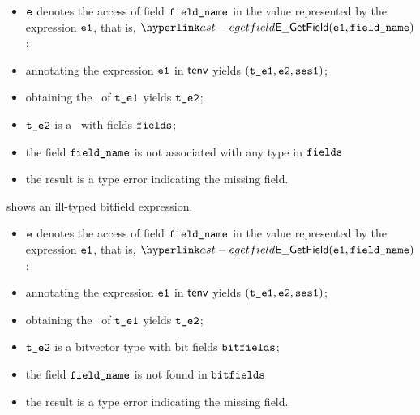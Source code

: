 \ProseParagraph
\AllApply
\begin{itemize}
  \item $\ve$ denotes the access of field $\fieldname$ in the value represented by the expression $\veone$, that is, $\EGetField(\veone, \fieldname)$;
  \item annotating the expression $\veone$ in $\tenv$ yields $(\vteone, \vetwo, \vsesone)$\ProseOrTypeError;
  \item obtaining the \underlyingtype\ of $\vteone$ yields $\vtetwo$\ProseOrTypeError;
  \item $\vtetwo$ is a \structuredtype\ with fields $\fields$;
  \item the field $\fieldname$ is not associated with any type in $\fields$
  \item the result is a type error indicating the missing field.
\end{itemize}
\FormallyParagraph
\begin{mathpar}
\end{mathpar}

 shows an ill-typed bitfield expression.

\ProseParagraph
\AllApply
\begin{itemize}
  \item $\ve$ denotes the access of field $\fieldname$ in the value represented by the expression $\veone$, that is, $\EGetField(\veone, \fieldname)$;
  \item annotating the expression $\veone$ in $\tenv$ yields $(\vteone, \vetwo, \vsesone)$\ProseOrTypeError;
  \item obtaining the \underlyingtype\ of $\vteone$ yields $\vtetwo$\ProseOrTypeError;
  \item $\vtetwo$ is a bitvector type with bit fields $\bitfields$;
  \item the field $\fieldname$ is not found in $\bitfields$
  \item the result is a type error indicating the missing field.
\end{itemize}

